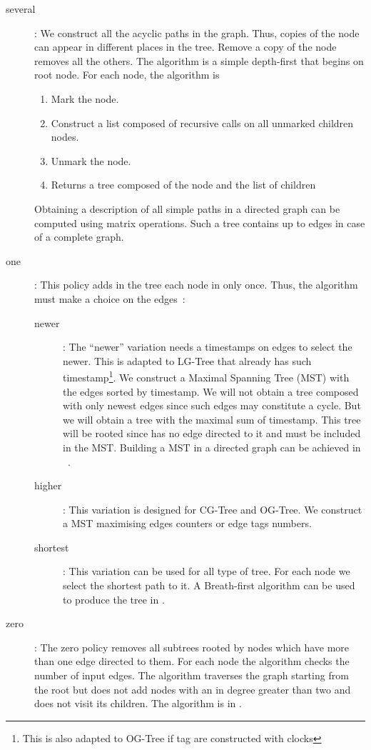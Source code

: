 \documentclass[a4paper]{article}
\begin{document}
\begin{description}
\item[several] : We construct all the acyclic paths in the
  graph. Thus, copies of the node can appear in different places in
  the tree. Remove a copy of the node removes all the others. The
  algorithm is a simple depth-first that begins on root node. For each
  node, the algorithm is
  \begin{enumerate}
  \item Mark the node.
  \item Construct a list  composed of recursive calls on all
    unmarked children nodes.
  \item Unmark the node.
  \item Returns a tree composed of the node and the list  of
    children
  \end{enumerate}
  Obtaining a description of all simple paths in a directed graph can
  be computed using  matrix operations. Such a tree contains
  up to  edges in case of a complete graph.
  
\item[one] : This policy adds in the tree each node in  only once. Thus,
  the algorithm must make a choice on the edges~:
  \begin{description}
  \item[newer] : The ``newer'' variation needs a timestamps on edges
    to select the newer. This is adapted to LG-Tree that already has
    such timestamp\footnote{This is also adapted to OG-Tree if tag are
      constructed with clocks}. We construct a Maximal Spanning Tree
    (MST) with the edges sorted by timestamp. We will not obtain a
    tree composed with only newest edges since such edges may
    constitute a cycle. But we will obtain a tree with the maximal sum
    of timestamp. This tree will be rooted since  has no edge
    directed to it and must be included in the MST. Building a MST in
    a directed graph can be achieved in ~\cite{gabow86efficient}.
  \item[higher] : This variation is designed for CG-Tree and OG-Tree. We
    construct a MST maximising edges counters or edge tags numbers.
  \item[shortest] : This variation can be used for all type of
    tree. For each node we select the shortest path to it. A
    Breath-first algorithm can be used to produce the tree in
    .\end{description}


\item [zero] : The zero policy removes all subtrees rooted by nodes
  which have more than one edge directed to them. For each node the
  algorithm checks the number of input edges. The algorithm traverses
  the graph starting from the root but does not add nodes with an in
  degree greater than two and does not visit its children. The
  algorithm is in .
\end{description}
\end{document}
